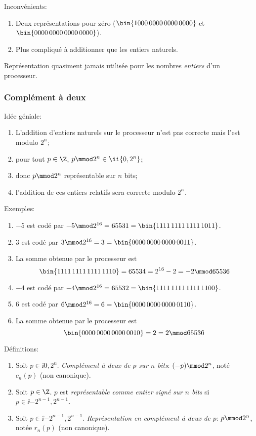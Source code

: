 Inconvénients:
\begin{enumerate}
\item Deux représentations pour zéro ($\bin{1000\,0000\,0000\,0000}$
  et $\bin{0000\,0000\,0000\,0000}$).
\item Plus compliqué à additionner que les entiers
  naturels.
\end{enumerate}

Représentation quasiment jamais utilisée pour les nombres
\emph{entiers} d'un processeur.
\subsubsection*{Complément à deux}
Idée géniale:
\begin{enumerate}
\item L'addition d'entiers naturels sur le processeur n'est pas
  correcte mais l'est modulo $2^{n}$;
\item pour tout $p\in \Z$, $p\mmod 2^{n} \in \ii{0,2^{n}}$;
\item donc $p\mmod 2^{n}$ représentable sur $n$ bits;
\item l'addition de ces entiers relatifs sera correcte modulo $2^{n}$.
\end{enumerate}

Exemples:
\begin{enumerate}
\item $-5$ est codé par $-5 \mmod 2^{16} = 65531 =
  \bin{1111\,1111\,1111\,1011}$.
\item $3$ est codé par $3 \mmod 2^{16} = 3 =
  \bin{0000\,0000\,0000\,0011}$.
\item La somme obtenue par le processeur est
  \begin{equation*}
    \bin{1111\,1111\,1111\,1110} = 65534 = 2^{16}-2 = -2 \mmod 65536
  \end{equation*}
\item $-4$ est codé par $-4 \mmod 2^{16} = 65532 =
  \bin{1111\,1111\,1111\,1100}$.
\item $6$ est codé par $6 \mmod 2^{16} = 6 =
  \bin{0000\,0000\,0000\,0110}$.
\item La somme obtenue par le processeur est
  \begin{equation*}
   \bin{0000\,0000\,0000\,0010} = 2 = 2 \mmod 65536
  \end{equation*}
\end{enumerate}

Définitions:
\begin{enumerate}
\item Soit $p\in \ii{0,2^{n}}$. \emph{Complément à deux de $p$ sur $n$
    bits}: $(-p) \mmod 2^{n}$, noté $c_{n}(p)$ (non canonique).
\item Soit $p\in\Z$. $p$ est \emph{représentable comme
    entier signé sur $n$ bits} si $p\in\ii{-2^{n-1},2^{n-1}}$.
\item Soit $p\in\ii{-2^{n-1},2^{n-1}}$. \emph{Représentation en
    complément à deux de $p$}: $p\mmod 2^{n}$, notée $r_{n}(p)$ (non
  canonique).
\end{enumerate}

